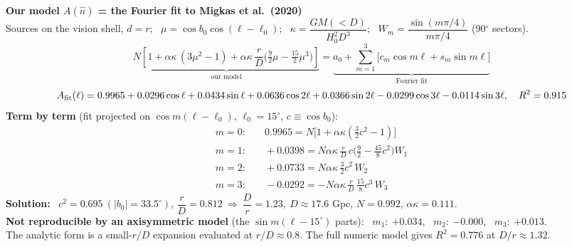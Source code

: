 \documentclass[11pt]{article}
\begin{document}
\noindent\textbf{\large Our model $A(\hat n)$ = the Fourier fit to Migkas et al.\ (2020)}\\[4pt]
Sources on the vision shell, $d=r$; \ $\mu=\cos b_0\cos(\ell-\ell_0)$; \ $\kappa=\dfrac{GM(<D)}{H_0^2D^3}$; \ $W_m=\dfrac{\sin(m\pi/4)}{m\pi/4}$ (90$^\circ$ sectors).
\begin{equation*}
\underbrace{N\!\left[1+\alpha\kappa\,(3\mu^2-1)+\alpha\kappa\,\frac{r}{D}\Big(\tfrac92\mu-\tfrac{15}{2}\mu^3\Big)\right]}_{\text{our model}}
=\underbrace{a_0+\sum_{m=1}^{3}\big[c_m\cos m\ell+s_m\sin m\ell\big]}_{\text{Fourier fit}}
\end{equation*}
\begin{equation*}
A_{\rm fit}(\ell)=0.9965+0.0296\cos\ell+0.0434\sin\ell+0.0636\cos2\ell+0.0366\sin2\ell-0.0299\cos3\ell-0.0114\sin3\ell,\quad R^2=0.915
\end{equation*}
\textbf{Term by term} (fit projected on $\cos m(\ell-\ell_0)$, $\ell_0=15^\circ$, $c\equiv\cos b_0$):
\begin{align*}
m=0:&\quad 0.9965 = N\big[1+\alpha\kappa(\tfrac32c^2-1)\big]\\
m=1:&\quad +0.0398 = N\alpha\kappa\,\tfrac{r}{D}\,c\Big(\tfrac92-\tfrac{45}{8}c^2\Big)W_1\\
m=2:&\quad +0.0733 = N\alpha\kappa\,\tfrac32c^2\,W_2\\
m=3:&\quad -0.0292 = -N\alpha\kappa\,\tfrac{r}{D}\,\tfrac{15}{8}c^3\,W_3
\end{align*}
\textbf{Solution:} \ $c^2=0.695\ (|b_0|=33.5^\circ)$, \quad $\dfrac{r}{D}=0.812\ \Rightarrow\ \dfrac{D}{r}=1.23,\ D\approx17.6$ Gpc, \quad $N=0.992$, \quad $\alpha\kappa=0.111$.\\[4pt]
\textbf{Not reproducible by an axisymmetric model} (the $\sin m(\ell-15^\circ)$ parts): \ $m_1{:}\ {+0.034}$, \ $m_2{:}\ {-0.000}$, \ $m_3{:}\ {+0.013}$.\\[2pt]
The analytic form is a small-$r/D$ expansion evaluated at $r/D\approx0.8$. The full numeric model gives $R^2=0.776$ at $D/r\approx1.32$.
\end{document}

